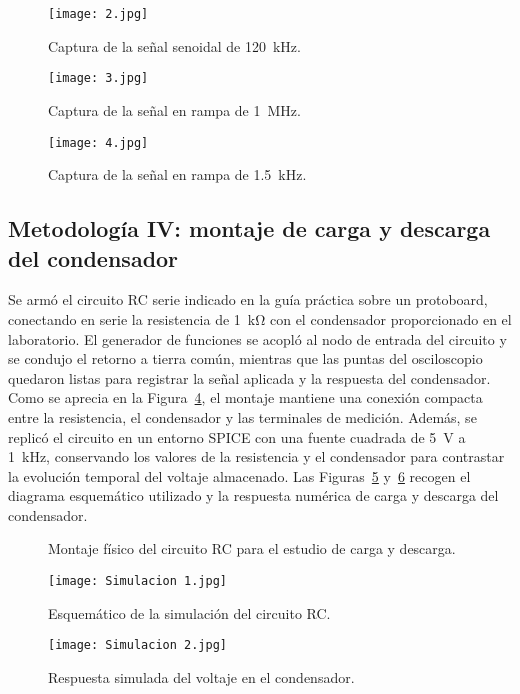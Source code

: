 \documentclass[conference]{IEEEtran} %
\begin{document}
\begin{figure}[H]
    \centering
    \texttt{[image: 2.jpg]}
    \caption{Captura de la señal senoidal de \SI{120}{\kilo\hertz}.}
    \label{fig:frecuencia-senoidal-120khz}
\end{figure}
\begin{figure}[H]
    \centering
    \texttt{[image: 3.jpg]}
    \caption{Captura de la señal en rampa de \SI{1}{\mega\hertz}.}
    \label{fig:frecuencia-rampa-1mhz}
\end{figure}
\begin{figure}[H]
    \centering
    \texttt{[image: 4.jpg]}
    \caption{Captura de la señal en rampa de \SI{1.5}{\kilo\hertz}.}
    \label{fig:frecuencia-rampa-1k5hz}
\end{figure}
\subsection{Metodología IV: montaje de carga y descarga del condensador}
Se armó el circuito RC serie indicado en la guía práctica sobre un protoboard, conectando en serie la resistencia de \SI{1}{\kilo\ohm} con el condensador proporcionado en el laboratorio. El generador de funciones se acopló al nodo de entrada del circuito y se condujo el retorno a tierra común, mientras que las puntas del osciloscopio quedaron listas para registrar la señal aplicada y la respuesta del condensador. Como se aprecia en la Figura~\ref{fig:montaje-rc}, el montaje mantiene una conexión compacta entre la resistencia, el condensador y las terminales de medición. Además, se replicó el circuito en un entorno SPICE con una fuente cuadrada de \SI{5}{\volt} a \SI{1}{\kilo\hertz}, conservando los valores de la resistencia y el condensador para contrastar la evolución temporal del voltaje almacenado. Las Figuras~\ref{fig:simulacion-rc-esquematico} y~\ref{fig:simulacion-rc-respuesta} recogen el diagrama esquemático utilizado y la respuesta numérica de carga y descarga del condensador.
\begin{figure}[H]
    \centering
    \framebox[0.75\linewidth]{\rule{0pt}{3.5cm}}
    \caption{Montaje físico del circuito RC para el estudio de carga y descarga.}
    \label{fig:montaje-rc}
\end{figure}
\begin{figure}[H]
    \centering
\texttt{[image: Simulacion 1.jpg]}
    \caption{Esquemático de la simulación del circuito RC.}
    \label{fig:simulacion-rc-esquematico}
\end{figure}
\begin{figure}[H]
    \centering
\texttt{[image: Simulacion 2.jpg]}
    \caption{Respuesta simulada del voltaje en el condensador.}
    \label{fig:simulacion-rc-respuesta}
\end{figure}
\end{document}
